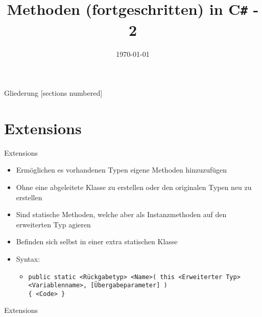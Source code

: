 



\title{Methoden (fortgeschritten) in C\texttt{\#} - 2}
\date{\today}




\maketitle

\begin{frame}{Gliederung}
	[sections numbered]
	\tableofcontents
\end{frame}

\section{Extensions}
\begin{frame}{Extensions}
	\begin{itemize}
		\item Ermöglichen es vorhandenen Typen eigene Methoden hinzuzufügen
		\item Ohne eine abgeleitete Klasse zu erstellen oder den originalen Typen neu zu erstellen
		\item Sind statische Methoden, welche aber als Instanzmethoden auf den erweiterten Typ agieren
		\item Befinden sich selbst in einer extra statischen Klasse
		\item Syntax:
		\begin{itemize}
			\item \texttt{public static \alert{<Rückgabetyp> <Name>}( this \alert{<Erweiterter Typ> <Variablenname>}, \alert{[Übergabeparameter]} )\\ \{ \alert{<Code>} \}}
		\end{itemize}
	\end{itemize}
\end{frame}

\begin{frame}{Extensions}
	
\end{frame}

